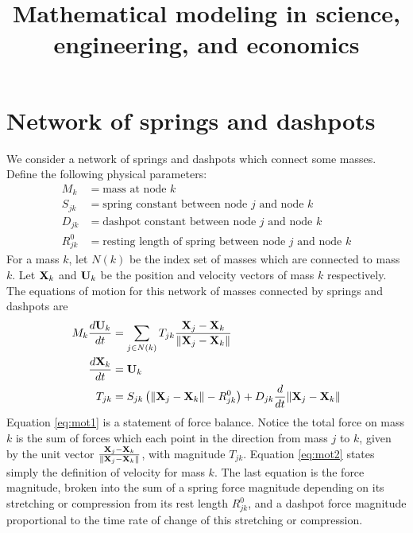 \documentclass[10pt]{article}
\begin{document}
\title{Mathematical modeling in science, engineering, and economics}
\maketitle


\section{Network of springs and dashpots}

We consider a network of springs and dashpots which connect some masses.  Define the following physical parameters:
\begin{align*}
M_k &= \text{mass at node }k \\
S_{jk} &= \text{spring constant between node $j$ and node $k$} \\
D_{jk} &= \text{dashpot constant between node $j$ and node $k$} \\
R^0_{jk} &= \text{resting length of spring between node $j$ and node $k$} 
\end{align*}
For a mass $k$, let $N(k)$ be the index set of masses which are connected to mass $k$.  Let ${\bf X}_k$ and ${\bf U}_k$ be the position and velocity vectors of mass $k$ respectively.  The equations of motion for this network of masses connected by springs and dashpots are
\begin{align}
\label{eq:mot1}
M_k \frac{d {\bf U}_k}{dt} &= \sum_{j \in N(k)} T_{jk} \frac{{\bf X}_j - {\bf X}_k}{\| {\bf X}_j - {\bf X}_k \|} \\
\label{eq:mot2}
\frac{d {\bf X}_k}{dt} &= {\bf U}_k \\
\label{eq:mot3}
T_{jk} &= S_{jk} \left( \|{\bf X}_j - {\bf X}_k\| - R^0_{jk} \right) + D_{jk} \frac{d}{dt} \|{\bf X}_j - {\bf X}_k \|
\end{align}
Equation \eqref{eq:mot1} is a statement of force balance.  Notice the total force on mass $k$ is the sum of forces which each point in the direction from mass $j$ to $k$, given by the unit vector $\frac{{\bf X}_j - {\bf X}_k}{\| {\bf X}_j - {\bf X}_k \|}$, with magnitude $T_{jk}$.  Equation \eqref{eq:mot2} states simply the definition of velocity for mass $k$.  The last equation is the force magnitude, broken into the sum of a spring force magnitude depending on its stretching or compression from its rest length $R_{jk}^0$, and a dashpot force magnitude proportional to the time rate of change of this stretching or compression.
\end{document}
